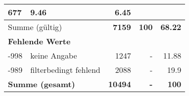 \begin{longtable}{lXrrr}
       \num{677} &
       \num[round-mode=places,round-precision=2]{9.46} &
         \num[round-mode=places,round-precision=2]{6.45} \\
     \midrule
     \multicolumn{2}{l}{Summe (gültig)} &
       \textbf{\num{7159}} &
     \textbf{\num{100}} &
       \textbf{\num[round-mode=places,round-precision=2]{68.22}} \\
     \multicolumn{5}{l}{\textbf{Fehlende Werte}}\\
       -998 &
       keine Angabe &
         \num{1247} &
        - &
         \num[round-mode=places,round-precision=2]{11.88} \\
       -989 &
       filterbedingt fehlend &
         \num{2088} &
        - &
         \num[round-mode=places,round-precision=2]{19.9} \\
     \midrule
     \multicolumn{2}{l}{\textbf{Summe (gesamt)}} &
          \textbf{\num{10494}} &
        \textbf{-} &
        \textbf{\num{100}} \\
     \bottomrule
     \end{longtable}
     
